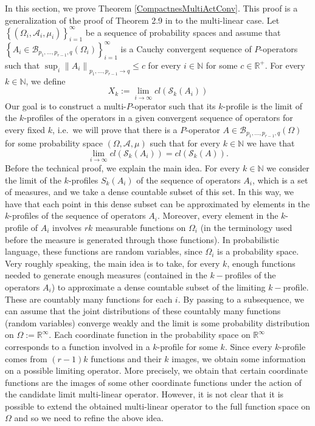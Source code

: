 \documentclass[11pt]{article}
\def\N{\mathbb{N}}
\begin{document}
In this section, we prove Theorem \ref{CompactnesMultiActConv}. This proof is a generalization of the proof of Theorem 2.9 in \cite{backhausz2018action} to the multi-linear case. Let $\left\{\left(\Omega_{i}, \mathcal{A}_{i}, \mu_{i}\right)\right\}_{i=1}^{\infty}$ be a sequence of probability spaces and assume that $\left\{A_{i} \in \mathcal{B}_{p_1,\ldots,p_{r-1}, q}\left(\Omega_{i}\right)\right\}_{i=1}^{\infty}$ is a Cauchy convergent sequence of $P$-operators such that $\sup_i \left\|A_{i}\right\|_{p_1,\ldots, p_{r-1}\rightarrow q} \leq c$ for every $i\in \N$ for some $c \in \mathbb{R}^{+}$. For every $k \in \mathbb{N}$, we define
$$
X_{k}:=\lim _{i \rightarrow \infty} cl(\mathcal{S}_{k}\left(A_{i}\right))
$$
Our goal is to construct a multi-$P$-operator such that its $k$-profile is the limit of the $k$-profiles of the operators in a given convergent sequence of operators for every fixed $k$, i.e.\ we will prove that there is a $P$-operator $A \in \mathcal{B}_{p_1,\ldots,p_{r-1}, q}(\Omega)$ for some probability space $(\Omega, \mathcal{A}, \mu)$ such that for every $k \in \mathbb{N}$ we have that
$$
\lim _{i \rightarrow \infty} cl(\mathcal{S}_{k}\left(A_{i}\right))=cl(\mathcal{S}_{k}(A)) .
$$
Before the technical proof, we explain the main idea. For every $k\in \N$ we consider the limit of the $k$-profiles $S_k(A_i)$ of the sequence of operators $A_i$, which is a set of measures, and we take a dense countable subset of this set. In this way, we have that each point in this dense subset can be approximated by elements in the $k$-profiles of the sequence of operators $A_{i}$. Moreover, every element in the $k$-profile of $A_{i}$ involves $r k$ measurable functions on $\Omega_{i}$ (in the terminology used before the measure is generated through those functions). In probabilistic language, these functions are random variables, since $\Omega_{i}$ is a probability space. Very roughly speaking, the main idea is to take, for every $k$, enough functions needed to generate enough measures (contained in the $k-$profiles of the operators $A_{i}$) to approximate a dense countable subset of the limiting $k-$profile. These are countably many functions for each $i$. By passing to a subsequence, we can assume that the joint distributions of these countably many functions (random variables) converge weakly and the limit is some probability distribution on $\Omega:=\mathbb{R}^{\infty}$. %
Each coordinate function in the probability space on $\mathbb{R}^{\infty}$ corresponds to a function involved in a $k$-profile for some $k$. Since every $k$-profile comes from $(r-1)k$ functions and their $k$ images, we obtain some information on a possible limiting operator. More precisely, we obtain that certain coordinate functions are the images of some other coordinate functions under the action of the candidate limit multi-linear operator. However, it is not clear that it is possible to extend the obtained multi-linear operator to the full function space on $\Omega$ and so we need to refine the above idea. 
\end{document}
